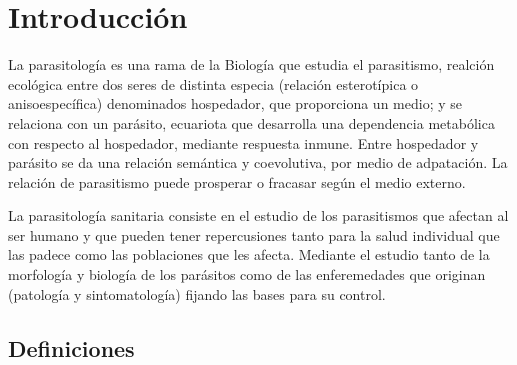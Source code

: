 \chapter{Introducción}
La parasitología es una rama de la Biología que estudia el parasitismo, realción ecológica entre dos seres de distinta especia (relación esterotípica o anisoespecífica) denominados hospedador, que proporciona un medio; y se relaciona con un parásito, ecuariota que desarrolla una dependencia metabólica con respecto al hospedador, mediante respuesta inmune. Entre hospedador y parásito se da una relación semántica y coevolutiva, por medio de adpatación. La relación de parasitismo puede prosperar o fracasar según el medio externo.

La parasitología sanitaria consiste en el estudio de los parasitismos que afectan al ser humano y que pueden tener repercusiones tanto para la salud individual que las padece como las poblaciones que les afecta. Mediante el estudio tanto de la morfología y biología de los parásitos como de las enferemedades que originan (patología y sintomatología) fijando las bases para su control.
\section{Definiciones}
